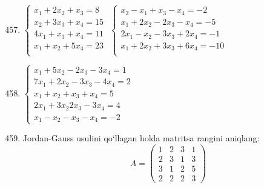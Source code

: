 \begin{enumerate}\setcounter{enumi}{456}
	\item $\begin{cases}
		x_{1}+2x_{2}+x_{3}=8\\
		x_{2}+3x_{3}+x_{4}=15\\
		4x_{1}+x_{3}+x_{4}=11\\
		x_{1}+x_{2}+5x_{4}=23\\
		
	\end{cases}$
\inlineitem
$\begin{cases}
	x_{2}-x_{1}+x_{3}-x_{4}=-2\\
	x_{1}+2x_{2}-2x_{3}-x_{4}=-5\\
	2x_{1}-x_{2}-3x_{3}+2x_{4}=-1\\
	x_{1}+2x_{2}+3x_{3}+6x_{4}=-10\\
\end{cases}$

\item $\begin{cases}
	x_{1}+5x_{2}-2x_{3}-3x_{4}=1\\
	7x_{1}+2x_{2}-3x_{3}-4x_{4}=2\\
	x_{1}+x_{2}+x_{3}+x_{4}=5\\
	2x_{1}+3x_{2}2x_{3}-3x_{4}=4\\
	x_{1}-x_{2}-x_{3}-x_{4}=-2
\end{cases}$
\item Jordan-Gauss usulini qo`llagan holda matritsa rangini aniqlang:
$$A=\begin{pmatrix}
	1&2&3&1\\
	2&3&1&3\\
	3&1&2&5\\
	2&2&2&3
\end{pmatrix}$$
\end{enumerate}
